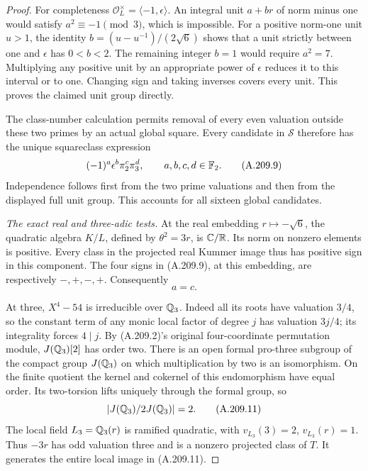 \begin{proof}
For completeness \(\mathcal O_L^\times=
\langle-1,\epsilon\rangle\).
An integral unit \(a+br\) of norm minus one would
satisfy \(a^2\equiv-1\pmod3\), which is impossible.
For a positive norm-one unit \(u>1\), the identity
\(b=(u-u^{-1})/(2\sqrt6)\) shows that a unit strictly
between one and \(\epsilon\) has \(0<b<2\).
The remaining integer \(b=1\) would require \(a^2=7\).
Multiplying any positive unit by an appropriate power
of \(\epsilon\) reduces it to this interval or to one.
Changing sign and taking inverses covers every unit.
This proves the claimed unit group directly.

The class-number calculation permits removal of every
even valuation outside these two primes by an actual
global square.  Every candidate in \(\mathcal S\)
therefore has the unique squareclass expression
\[
                  (-1)^a\epsilon^b\pi_2^c\pi_3^d,
                 \qquad a,b,c,d\in\mathbb F_2.
\tag{A.209.9}
\]
Independence follows first from the two prime valuations
and then from the displayed full unit group.  This
accounts for all sixteen global candidates.

\emph{The exact real and three-adic tests.}
At the real embedding \(r\mapsto-\sqrt6\), the
quadratic algebra \(K/L\), defined by \(\theta^2=3r\),
is \(\mathbb C/\mathbb R\).  Its norm on nonzero elements is
positive.  Every class in the projected real Kummer
image thus has positive sign in this component.
The four signs in (A.209.9), at this embedding, are
respectively \(-,+,-,+\).  Consequently
\[
                              a=c.
\tag{A.209.10}
\]

At three, \(X^4-54\) is irreducible over \(\mathbb Q_3\).
Indeed all its roots have valuation \(3/4\), so the
constant term of any monic local factor of degree \(j\)
has valuation \(3j/4\); its integrality forces
\(4\mid j\).  By (A.209.2)'s original four-coordinate
permutation module, \(J(\mathbb Q_3)[2]\) has order two.
There is an open formal pro-three subgroup of the compact
group \(J(\mathbb Q_3)\) on which multiplication by two is
an isomorphism.  On the finite quotient the kernel and
cokernel of this endomorphism have equal order.
Its two-torsion lifts uniquely through the formal group,
so
\[
                         |J(\mathbb Q_3)/2J(\mathbb Q_3)|=2.
\tag{A.209.11}
\]
The local field \(L_3=\mathbb Q_3(r)\) is ramified quadratic,
with \(v_{L_3}(3)=2\), \(v_{L_3}(r)=1\).
Thus \(-3r\) has odd valuation three and is a nonzero
projected class of \(T\).  It generates the entire
local image in (A.209.11).


\end{proof}
